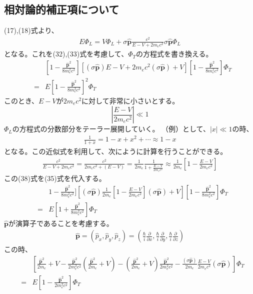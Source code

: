 \documentclass[10pt]{jreport}
\begin{document}
\subsection*{相対論的補正項について}
(17),(18)式より、
\begin{eqnarray}
E\Phi_L = V\Phi_L +\sigma\hat{\textbf{p}}\frac{c^2}{E-V+2m_ec^2}\sigma\hat{\textbf{p}}\Phi_L
\end{eqnarray}
となる。これを(32),(33)式を考慮して、$\Phi_T$の方程式を書き換える。
\begin{eqnarray}
&&[1-\frac{\hat{\textbf{p}}^2}{8m_e^2 c^2}][(\sigma\hat{\textbf{p}}){E-V+2m_ec^2}(\sigma\hat{\textbf{p}})+V][1-\frac{\hat{\textbf{p}}^2}{8m_e^2 c^2}]\Phi_T \nonumber \\
&=& E [1-\frac{\hat{\textbf{p}}^2}{8m_e^2 c^2}]^2 \Phi_T
\end{eqnarray}
このとき、$E-V$が$2m_ec^2$に対して非常に小さいとする。
\begin{equation}
|\frac{E-V}{2m_ec^2}|\ll1
\end{equation}
$\Phi_L$の方程式の分数部分をテーラー展開していく。
（例）として、$|x|\ll1$の時、
\begin{eqnarray}
\frac{1}{1+x} =1-x+x^2+ \cdots \approx 1-x 
\end{eqnarray}
となる。この近似式を利用して、次にように計算を行うことができる。
\begin{eqnarray}
\frac{c^2}{E-V+2m_ec^2}=\frac{c^2}{2m_ec^2+(E-V)}=\frac{1}{2m_e}\frac{1}{1+\frac{E-V}{2m_ec^2}}\approx\frac{1}{2m_e}[1-\frac{E-V}{2m_ec^2}]
\end{eqnarray}
この(38)式を(35)式を代入する。
\begin{eqnarray}
&&1-\frac{\hat{\textbf{p}}^2}{8m_e^2 c^2}][(\sigma\hat{\textbf{p}})\frac{1}{2m_e}[1-\frac{E-V}{2m_ec^2}](\sigma\hat{\textbf{p}})+V][1-\frac{\hat{\textbf{p}}^2}{8m_e^2 c^2}]\Phi_T \nonumber \\
&=& E[1+\frac{\hat{\textbf{p}}^2}{8m_e^2 c^2}]\Phi_T
\end{eqnarray}
$\hat{\textbf{p}}$が演算子であることを考慮する。
\begin{eqnarray}
\hat{\textbf{p}}=(\hat{p}_x,\hat{p}_y,\hat{p}_z)=(\frac{\hbar}{i}\frac{\partial}{\partial x},\frac{\hbar}{i}\frac{\partial}{\partial y},\frac{\hbar}{i}\frac{\partial}{\partial z})
\end{eqnarray}
この時、
\begin{eqnarray}
&&[\frac{\hat{\textbf{p}}^2}{2m_e}+V-\frac{\hat{\textbf{p}}^2}{2m_e^2c^2}(\frac{\hat{\textbf{p}}^2}{2m_e}+V)-(\frac{\hat{\textbf{p}}^2}{2m_e}+V)\frac{\hat{\textbf{p}}^2}{2m_e^2c^2}-\frac{(\sigma\hat{\textbf{p}})}{2m_e}\frac{E-V}{2m_ec^2}(\sigma\hat{\textbf{p}})]\Phi_T \nonumber \\
&=& E[1-\frac{\hat{\textbf{p}}^2}{2m_e^2c^2}]\Phi_T
\end{eqnarray}
\end{document}
